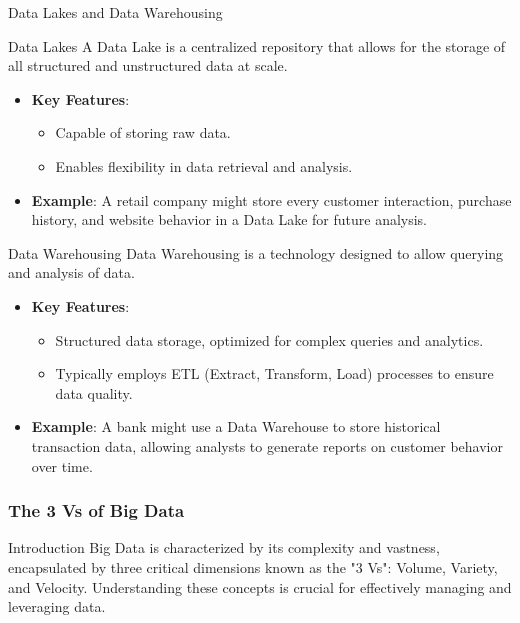 \documentclass[aspectratio=169]{beamer}
\begin{document}
\begin{frame}[fragile]{Data Lakes and Data Warehousing}
    \begin{block}{Data Lakes}
        A Data Lake is a centralized repository that allows for the storage of all structured and unstructured data at scale.
        \begin{itemize}
            \item \textbf{Key Features}:
            \begin{itemize}
                \item Capable of storing raw data.
                \item Enables flexibility in data retrieval and analysis.
            \end{itemize}
            \item \textbf{Example}: A retail company might store every customer interaction, purchase history, and website behavior in a Data Lake for future analysis.
        \end{itemize}
    \end{block}

    \begin{block}{Data Warehousing}
        Data Warehousing is a technology designed to allow querying and analysis of data.
        \begin{itemize}
            \item \textbf{Key Features}:
            \begin{itemize}
                \item Structured data storage, optimized for complex queries and analytics.
                \item Typically employs ETL (Extract, Transform, Load) processes to ensure data quality.
            \end{itemize}
            \item \textbf{Example}: A bank might use a Data Warehouse to store historical transaction data, allowing analysts to generate reports on customer behavior over time.
        \end{itemize}
    \end{block}
\end{frame}

\begin{frame}[fragile]
    \frametitle{The 3 Vs of Big Data}
    \begin{block}{Introduction}
        Big Data is characterized by its complexity and vastness, encapsulated by three critical dimensions known as the "3 Vs": Volume, Variety, and Velocity. Understanding these concepts is crucial for effectively managing and leveraging data.
    \end{block}
\end{frame}
\end{document}
